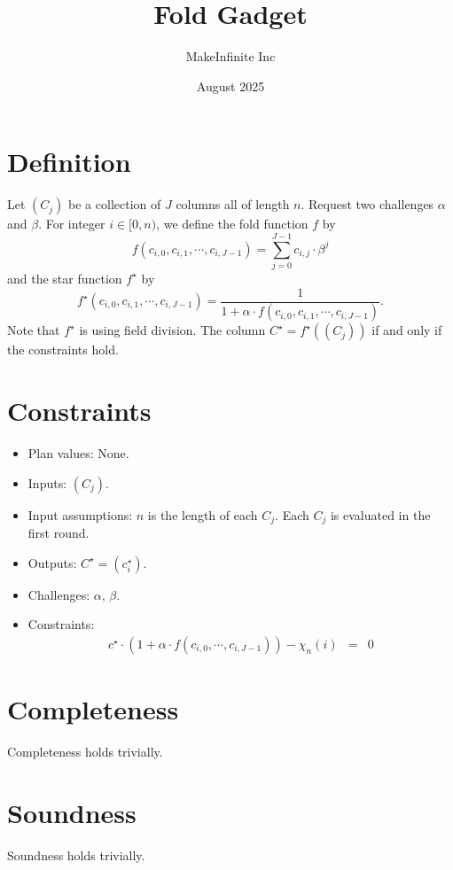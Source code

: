 \documentclass[11pt]{article}
\title{Fold Gadget}
\author{MakeInfinite Inc}
\date{August 2025}
\begin{document}
\maketitle

\section{Definition}
\noindent Let $(C_j)$ be a collection of $J$ columns all of length $n$. Request two challenges $\alpha$ and $\beta$. For integer $i\in[0,n)$, we define the fold function $f$ by 
$$f(c_{i,0},c_{i,1},\cdots,c_{i,J-1})=\sum_{j=0}^{J-1}c_{i,j}\cdot\beta^j$$
and the star function $f^\star$ by
$$f^\star(c_{i,0},c_{i,1},\cdots,c_{i,J-1})=\frac{1}{1+\alpha\cdot f(c_{i,0},c_{i,1},\cdots,c_{i,J-1})}.$$
Note that $f^\star$ is using field division.
The column $C^\star=f^\star((C_j))$ if and only if the constraints hold.
\section{Constraints}
\begin{itemize}
    \item Plan values: None.
    \item Inputs: $(C_j)$.
    \item Input assumptions: $n$ is the length of each $C_j$. Each $C_j$ is evaluated in the first round.
    \item Outputs: $C^\star=(c^\star_i)$.
    \item Challenges: $\alpha$, $\beta$.
    \item Constraints:
    \begin{eqnarray}
    c^\star\cdot(1+\alpha\cdot f(c_{i,0},\cdots,c_{i,J-1}))-\chi_n(i)&=&0
    \end{eqnarray}
    
    
\end{itemize}

\section{Completeness}
Completeness holds trivially.
\section{Soundness}
Soundness holds trivially.
\end{document}
